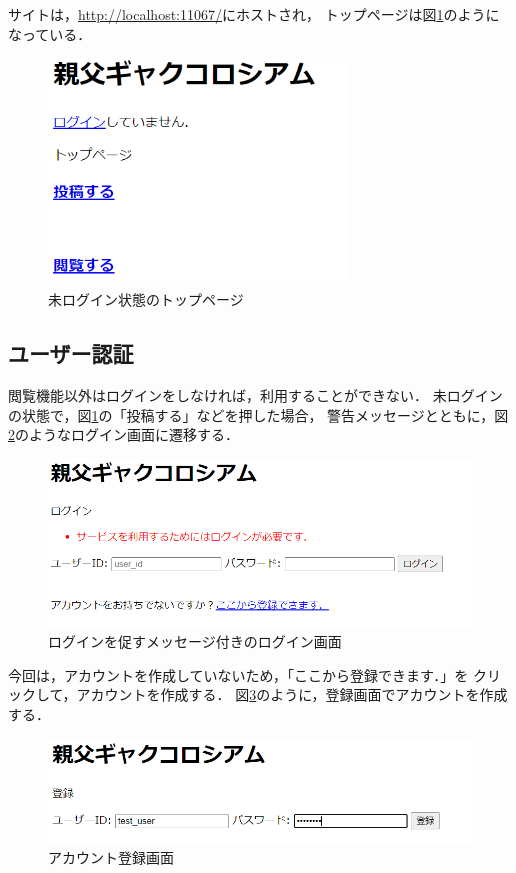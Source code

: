 \documentclass[a4paper,dvipdfmx,11pt]{jsreport}
\begin{document}
サイトは，\url{http://localhost:11067/}にホストされ，
トップページは図\ref{fig:top_unauth}のようになっている．

\begin{figure}[tb]
  \centering
  \includegraphics[width=8cm]{img/top_unauth.png}
  \caption{未ログイン状態のトップページ\label{fig:top_unauth}}
\end{figure}

\subsection{ユーザー認証}
閲覧機能以外はログインをしなければ，利用することができない．
未ログインの状態で，図\ref{fig:top_unauth}の「投稿する」などを押した場合，
警告メッセージとともに，図\ref{fig:login_post}のようなログイン画面に遷移する．
\begin{figure}[tb]
  \centering
  \includegraphics*[width=13cm]{img/login_post.png}
  \caption{ログインを促すメッセージ付きのログイン画面 \label{fig:login_post}}
\end{figure}

今回は，アカウントを作成していないため，「ここから登録できます．」を
クリックして，アカウントを作成する．
図\ref{fig:register}のように，登録画面でアカウントを作成する．
\begin{figure}[tb]
  \centering
  \includegraphics*[width=13cm]{img/register.png}
  \caption{アカウント登録画面\label{fig:register}}
\end{figure}
\end{document}

